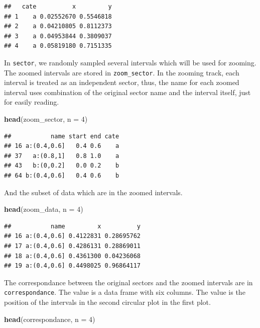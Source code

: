 \documentclass[]{book}
\newenvironment{Shaded}{\begin{snugshade}}{\end{snugshade}}
\newcommand{\KeywordTok}[1]{\textcolor[rgb]{0.13,0.29,0.53}{\textbf{#1}}}
\newcommand{\DataTypeTok}[1]{\textcolor[rgb]{0.13,0.29,0.53}{#1}}
\newcommand{\DecValTok}[1]{\textcolor[rgb]{0.00,0.00,0.81}{#1}}
\newcommand{\NormalTok}[1]{#1}
\begin{document}
\begin{verbatim}
##   cate          x         y
## 1    a 0.02552670 0.5546818
## 2    a 0.04210805 0.8112373
## 3    a 0.04953844 0.3809037
## 4    a 0.05819180 0.7151335
\end{verbatim}

In \texttt{sector}, we randomly sampled several intervals which will be
used for zooming. The zoomed intervals are stored in
\texttt{zoom\_sector}. In the zooming track, each interval is treated as
an independent sector, thus, the name for each zoomed interval uses
combination of the original sector name and the interval itself, just
for easily reading.

\begin{Shaded}
\begin{Highlighting}[]
\KeywordTok{head}\NormalTok{(zoom_sector, }\DataTypeTok{n =} \DecValTok{4}\NormalTok{)}
\end{Highlighting}
\end{Shaded}

\begin{verbatim}
##           name start end cate
## 16 a:(0.4,0.6]   0.4 0.6    a
## 37   a:(0.8,1]   0.8 1.0    a
## 43   b:(0,0.2]   0.0 0.2    b
## 64 b:(0.4,0.6]   0.4 0.6    b
\end{verbatim}

And the subset of data which are in the zoomed intervals.

\begin{Shaded}
\begin{Highlighting}[]
\KeywordTok{head}\NormalTok{(zoom_data, }\DataTypeTok{n =} \DecValTok{4}\NormalTok{)}
\end{Highlighting}
\end{Shaded}

\begin{verbatim}
##           name         x          y
## 16 a:(0.4,0.6] 0.4122831 0.28695762
## 17 a:(0.4,0.6] 0.4286131 0.28869011
## 18 a:(0.4,0.6] 0.4361300 0.04236068
## 19 a:(0.4,0.6] 0.4498025 0.96864117
\end{verbatim}

The correspondance between the original sectors and the zoomed intervals
are in \texttt{correspondance}. The value is a data frame with six
columns. The value is the position of the intervals in the second
circular plot in the first plot.

\begin{Shaded}
\begin{Highlighting}[]
\KeywordTok{head}\NormalTok{(correspondance, }\DataTypeTok{n =} \DecValTok{4}\NormalTok{)}
\end{Highlighting}
\end{Shaded}
\end{document}
